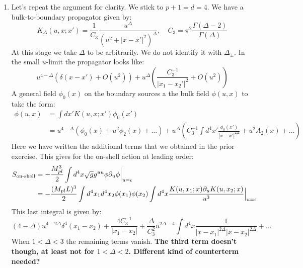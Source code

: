 \documentclass[11pt, class=article, crop=false]{standalone}
\begin{document}
\begin{enumerate}
	\item Let's repeat the argument for clarity. We stick to $p+1=d=4$. We have a bulk-to-boundary propagator given by:
	\[
		K_{\Delta}(u, x; x') = \frac{1}{C_3} \frac{u^\Delta}{(u^2 + |x-x'|^2)^\Delta}, \quad C_3 = \pi^2 \frac{\Gamma(\Delta-2)}{\Gamma(\Delta)}
	\]
	At this stage we take $\Delta$ to be arbitrarily. We do not identify it with $\Delta_\pm$. In the small $u$-limit the propagator looks like:
	\[
		u^{4-\Delta} (\delta(x- x') + O(u^2)) + u^{\Delta} \left(\frac{C_3^{-1}}{|x_1 - x_2'|^2} + O(u^2)\right)
	\]
	A general field $\phi_0(x)$ on the boundary sources a the bulk field $\phi(u, x)$ to take the form:
	\begin{equation}\label{eq:small-u-phi}
	\begin{aligned}
		\phi(u, x) &= \int dx' K(u, x; x') \phi_0 (x') \\ 
		&= u^{4-\Delta} (\phi_0 (x) + u^2 \phi_2 (x) + \dots) +  u^{\Delta} \left(C_3^{-1} \int d^4x' \frac{\phi_0(x')}{|x-x'|^{2\Delta}} + u^2 A_2(x) + \dots \right)
	\end{aligned}
	\end{equation}
	Here we have written the additional terms that we obtained in the prior exercise. This gives for the on-shell action at leading order:
	\[
	\begin{aligned}
		S_{\text{on-shell}} &= - \frac{M_{pl}^3}{2} \int d^4 x \sqrt{g} g^{uu} \phi \partial_u \phi\Big|_{u = \epsilon}\\
		&= - \frac{(M_{pl} L)^3}{2} \int d^4 x_1 d^4 x_2 \phi(x_1) \phi(x_2) \int d^4 x \frac{K(u, x_1; x) \partial_u K(u, x_2; x)}{u^3}\Big|_{u = \epsilon}\\
	\end{aligned}
	\]
	This last integral is given by:
	\[
		(4-\Delta) u^{4-2\Delta} \delta^4 (x_1 - x_2) + \frac{4 C_3^{-1}}{|x_1 - x_2|} + \frac{\Delta}{C_3^2} u^{2 \Delta - 4} \int d^4 x \frac{1}{|x-x_1|^{2\Delta} |x-x_2|^{2\Delta}} + \dots
	\]
	When $1 < \Delta < 3$ the remaining terms vanish. \textbf{The third term doesn't though, at least not for $1<\Delta<2$. Different kind of counterterm needed?}
	

\end{enumerate}
\end{document}
